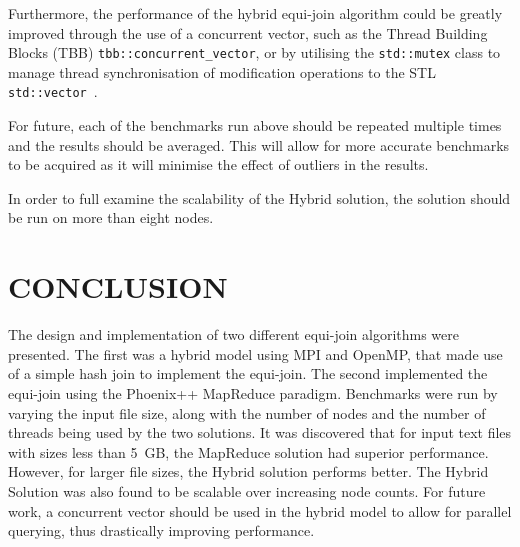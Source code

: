 \documentclass[12pt,twocolumn]{witseiepaper}
\begin{document}
Furthermore, the performance of the hybrid equi-join algorithm could be greatly improved through the use of a concurrent vector, such as the Thread Building Blocks (TBB) \texttt{tbb::concurrent\_vector}, or by utilising the \texttt{std::mutex} class to manage thread synchronisation of modification operations to the STL \texttt{std::vector}~\cite{tbb,mutex}.

For future, each of the benchmarks run above should be repeated multiple times and the results should be averaged. This will allow for more accurate benchmarks to be acquired as it will minimise the effect of outliers in the results.

In order to full examine the scalability of the Hybrid solution, the solution should be run on more than eight nodes.

\section{CONCLUSION}
The design and implementation of two different equi-join algorithms were presented. The first was a hybrid model using MPI and OpenMP, that made use of a simple hash join to implement the equi-join. The second implemented the equi-join using the Phoenix++ MapReduce paradigm. Benchmarks were run by varying the input file size, along with the number of nodes and the number of threads being used by the two solutions. It was discovered that for input text files with sizes less than 5~GB, the MapReduce solution had superior performance. However, for larger file sizes, the Hybrid solution performs better. The Hybrid Solution was also found to be scalable over increasing node counts. For future work, a concurrent vector should be used in the hybrid model to allow for parallel querying, thus drastically improving performance.


{
	{\small

}
}
\end{document}
